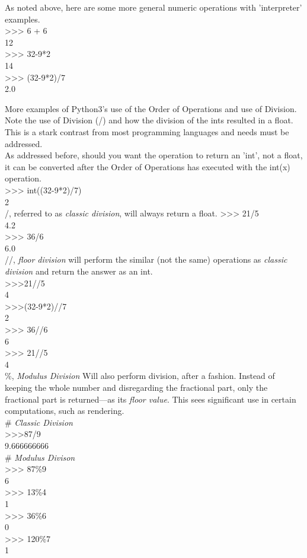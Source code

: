 \documentclass[oneside,12pt]{memoir} %
\begin{document}
As noted above, here are some more general numeric operations with 'interpreter' examples.\\

{>}{>}{>} 6 + 6\\
12\\
{>}{>}{>} 32-9*2\\
14\\
{>}{>}{>} (32-9*2)/7\\
2.0 

More examples of Python3's use of the Order of Operations and use of Division. Note the use of Division (/) and how the division of the ints resulted in a float. This is a stark contrast from most programming languages and needs must be addressed.\\

As addressed before, should you want the operation to return an 'int', not a float, it can be converted after the Order of Operations has executed with the int(x) operation.\\

{>}{>}{>} int((32-9*2)/7)\\
2\\

/, referred to as \emph{classic division}, will always return a float. 
{>}{>}{>} 21/5\\
4.2\\
{>}{>}{>} 36/6\\
6.0\\

//, \emph{floor division} will perform the similar (not the same) operations as \emph{classic division} and return the answer as an int. \\

{>}{>}{>}21//5\\
4\\
{>}{>}{>}(32-9*2)//7\\
2\\
{>}{>}{>} 36//6\\
6\\
{>}{>}{>} 21//5\\
4\\

\%, \emph{Modulus Division} Will also perform division, after a fashion. Instead of keeping the whole number and disregarding the fractional part, only the fractional part is returned––as its \emph{floor value}. This sees significant use in certain computations, such as rendering. \\
\# \emph{Classic Division}\\
{>}{>}{>}87/9\\
9.666666666\\
\# \emph{Modulus Divison}\\
{>}{>}{>} 87\%9\\
6\\
{>}{>}{>} 13\%4\\
1\\
{>}{>}{>} 36\%6\\
0\\
{>}{>}{>} 120\%7\\
1\\
\end{document}
